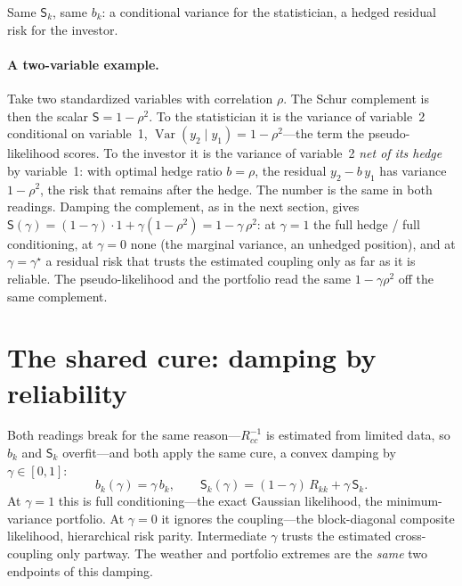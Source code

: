 \documentclass[11pt]{article}
\newcommand{\gstar}{\gamma^\star}
\newcommand{\Sc}{\mathsf S}
\begin{document}
Same $\Sc_k$, same $b_k$: a conditional variance for the statistician, a hedged residual risk for the
investor.

\paragraph{A two-variable example.} Take two standardized variables with correlation $\rho$. The Schur
complement is then the scalar $\Sc=1-\rho^2$. To the statistician it is the variance of
variable~2 conditional on variable~1, $\operatorname{Var}(y_2\mid y_1)=1-\rho^2$---the term the
pseudo-likelihood scores. To the investor it is the variance of variable~2 \emph{net of its hedge} by
variable~1: with optimal hedge ratio $b=\rho$, the residual $y_2-b\,y_1$ has variance $1-\rho^2$, the
risk that remains after the hedge. The number is the same in both readings. Damping the complement,
as in the next section, gives $\Sc(\gamma)=(1-\gamma)\cdot 1+\gamma(1-\rho^2)=1-\gamma\,\rho^2$: at $\gamma=1$
the full hedge / full conditioning, at $\gamma=0$ none (the marginal variance, an unhedged position),
and at $\gamma=\gstar$ a residual risk that trusts the estimated coupling only as far as it is reliable.
The pseudo-likelihood and the portfolio read the same $1-\gamma\rho^2$ off the same complement.

\section{The shared cure: damping by reliability}
Both readings break for the same reason---$R_{cc}^{-1}$ is estimated from limited data, so $b_k$ and
$\Sc_k$ overfit---and both apply the same cure, a convex damping by $\gamma\in[0,1]$:
\begin{equation}
  b_k(\gamma)=\gamma\,b_k,\qquad \Sc_k(\gamma)=(1-\gamma)\,R_{kk}+\gamma\,\Sc_k.
\end{equation}
At $\gamma=1$ this is full conditioning---the exact Gaussian likelihood, the minimum-variance
portfolio. At $\gamma=0$ it ignores the coupling---the block-diagonal composite likelihood, hierarchical
risk parity. Intermediate $\gamma$ trusts the estimated cross-coupling only partway. The weather and
portfolio extremes are the \emph{same} two endpoints of this damping.
\end{document}

